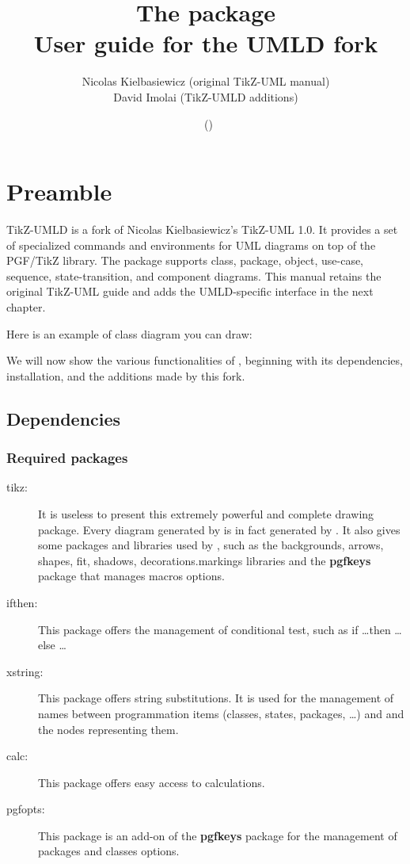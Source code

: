 \documentclass[a4paper,11pt]{report}
\date{\umldversion\ (\umlddate)}
\title{The \tuml package\\\large User guide for the UMLD fork}
\author{Nicolas {\sc Kielbasiewicz} (original TikZ-UML manual)\\
David {\sc Imolai} (TikZ-UMLD additions)}
\begin{document}
\maketitle

\tableofcontents

\chapter{Preamble}

TikZ-UMLD is a fork of Nicolas Kielbasiewicz's TikZ-UML 1.0. It provides a set
of specialized commands and environments for UML diagrams on top of the
	{\sc PGF/TikZ} library. The package supports class, package, object, use-case,
sequence, state-transition, and component diagrams. This manual retains the
original TikZ-UML guide and adds the UMLD-specific interface in the next
chapter.

Here is an example of class diagram you can draw:

\begin{center}
\end{center}

We will now show the various functionalities of \tuml, beginning with its
dependencies, installation, and the additions made by this fork.

\section{Dependencies}

\subsection{Required packages}

\begin{description}
	\item[tikz:] It is useless to present this extremely powerful and complete drawing package. Every diagram generated by \tuml is in fact generated by \TikZ. It also gives some packages and libraries used by \tuml, such as the backgrounds, arrows, shapes, fit, shadows, decorations.markings libraries and the {\bf pgfkeys} package that manages macros options.
	\item[ifthen:] This package offers the management of conditional test, such as if \ldots then \ldots else \ldots
	\item[xstring:] This package offers string substitutions. It is used for the management of names between programmation items (classes, states, packages, \ldots) and and the nodes representing them.
	\item[calc:] This package offers easy access to calculations.
	\item[pgfopts:] This package is an add-on of the {\bf pgfkeys} package for the management of packages and classes options.
\end{description}
\end{document}
